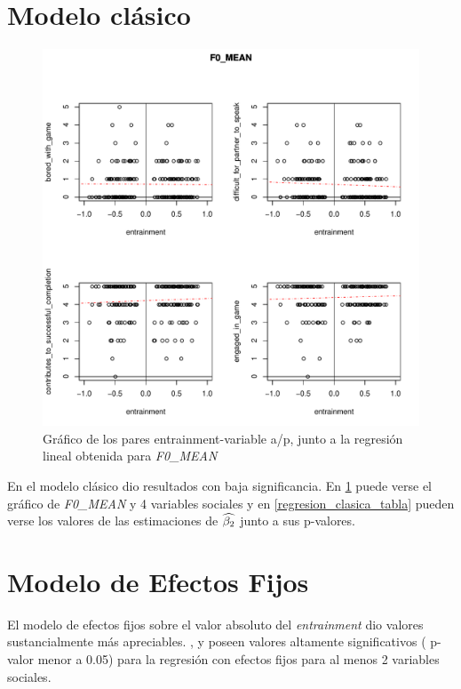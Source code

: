 \section{Modelo clásico}

\begin{figure}[t!]
\includegraphics[width=15cm]{images/regression_F0_MEAN_1.pdf}
\caption{Gráfico de los pares entrainment-variable a/p, junto a la regresión lineal obtenida \label{regresion_clasica} para \emph{F0\_MEAN}}
\end{figure}

En el modelo clásico dio resultados con baja significancia. En \ref{regresion_clasica} puede verse el gráfico de \emph{F0\_MEAN} y 4 variables sociales y en \ref{regresion_clasica_tabla} pueden verse los valores de las estimaciones de $\widehat{\beta_2}$ junto a sus p-valores.






\section{Modelo de Efectos Fijos}

\newcommand{\slopeestim}[1] { $\estslope \sim #1$ }

El modelo de efectos fijos sobre el valor absoluto del \emph{entrainment} dio valores sustancialmente más apreciables. \ENGMAX, \FOMEAN y \NOISETOHARMONICS poseen valores altamente significativos ( p-valor menor a 0.05) para la regresión con efectos fijos para al menos 2 variables sociales.

